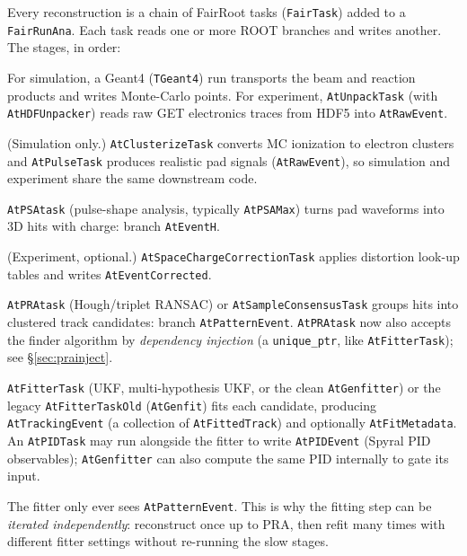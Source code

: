 \documentclass[11pt,a4paper]{article}
\newcommand{\code}[1]{\texttt{\small #1}}
\begin{document}
Every reconstruction is a chain of FairRoot tasks (\code{FairTask}) added to a
\code{FairRunAna}. Each task reads one or more ROOT branches and writes another.
The stages, in order:

\begin{description}[leftmargin=1.4cm,style=nextline]
  \item[Simulation / Unpacking] For simulation, a Geant4 (\code{TGeant4}) run
  transports the beam and reaction products and writes Monte-Carlo points. For
  experiment, \code{AtUnpackTask} (with \code{AtHDFUnpacker}) reads raw GET
  electronics traces from HDF5 into \code{AtRawEvent}.
  \item[Digitization] (Simulation only.) \code{AtClusterizeTask} converts MC
  ionization to electron clusters and \code{AtPulseTask} produces realistic pad
  signals (\code{AtRawEvent}), so simulation and experiment share the same
  downstream code.
  \item[PSA] \code{AtPSAtask} (pulse-shape analysis, typically \code{AtPSAMax})
  turns pad waveforms into 3D hits with charge: branch \code{AtEventH}.
  \item[Space-charge correction] (Experiment, optional.)
  \code{AtSpaceChargeCorrectionTask} applies distortion look-up tables and writes
  \code{AtEventCorrected}.
  \item[Pattern recognition (PRA)] \code{AtPRAtask} (Hough/triplet RANSAC) or
  \code{AtSampleConsensusTask} groups hits into clustered track candidates:
  branch \code{AtPatternEvent}. \code{AtPRAtask} now also accepts the
  finder algorithm by \emph{dependency injection} (a \code{unique\_ptr}, like
  \code{AtFitterTask}); see \S\ref{sec:prainject}.
  \item[Fitting] \code{AtFitterTask} (UKF, multi-hypothesis UKF, or the clean
  \code{AtGenfitter}) or the legacy \code{AtFitterTaskOld} (\code{AtGenfit}) fits
  each candidate, producing \code{AtTrackingEvent} (a collection of
  \code{AtFittedTrack}) and optionally \code{AtFitMetadata}. An \code{AtPIDTask}
  may run alongside the fitter to write \code{AtPIDEvent} (Spyral PID observables);
  \code{AtGenfitter} can also compute the same PID internally to gate its input.
\end{description}

\begin{notebox}
The fitter only ever sees \code{AtPatternEvent}. This is why the fitting step can
be \emph{iterated independently}: reconstruct once up to PRA, then refit many
times with different fitter settings without re-running the slow stages.
\end{notebox}
\end{document}
